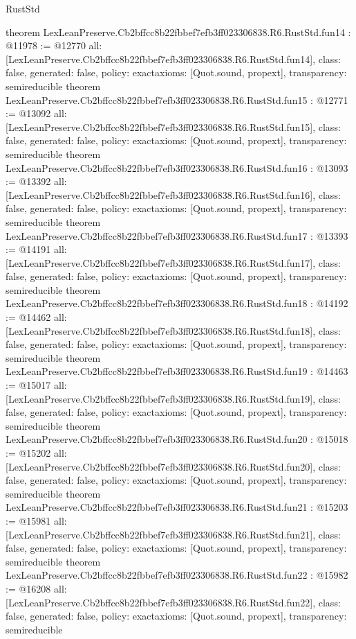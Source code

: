 \begin{lexlean}{RustStd}
\begin{coremodule}
{}
theorem LexLeanPreserve.Cb2bffcc8b22fbbef7efb3ff023306838.R6.RustStd.fun14 : @11978 := @12770 {
  all: [LexLeanPreserve.Cb2bffcc8b22fbbef7efb3ff023306838.R6.RustStd.fun14],
  class: false,
  generated: false,
  policy: exact{axioms: [Quot.sound, propext]},
  transparency: semireducible
}
theorem LexLeanPreserve.Cb2bffcc8b22fbbef7efb3ff023306838.R6.RustStd.fun15 : @12771 := @13092 {
  all: [LexLeanPreserve.Cb2bffcc8b22fbbef7efb3ff023306838.R6.RustStd.fun15],
  class: false,
  generated: false,
  policy: exact{axioms: [Quot.sound, propext]},
  transparency: semireducible
}
theorem LexLeanPreserve.Cb2bffcc8b22fbbef7efb3ff023306838.R6.RustStd.fun16 : @13093 := @13392 {
  all: [LexLeanPreserve.Cb2bffcc8b22fbbef7efb3ff023306838.R6.RustStd.fun16],
  class: false,
  generated: false,
  policy: exact{axioms: [Quot.sound, propext]},
  transparency: semireducible
}
theorem LexLeanPreserve.Cb2bffcc8b22fbbef7efb3ff023306838.R6.RustStd.fun17 : @13393 := @14191 {
  all: [LexLeanPreserve.Cb2bffcc8b22fbbef7efb3ff023306838.R6.RustStd.fun17],
  class: false,
  generated: false,
  policy: exact{axioms: [Quot.sound, propext]},
  transparency: semireducible
}
theorem LexLeanPreserve.Cb2bffcc8b22fbbef7efb3ff023306838.R6.RustStd.fun18 : @14192 := @14462 {
  all: [LexLeanPreserve.Cb2bffcc8b22fbbef7efb3ff023306838.R6.RustStd.fun18],
  class: false,
  generated: false,
  policy: exact{axioms: [Quot.sound, propext]},
  transparency: semireducible
}
theorem LexLeanPreserve.Cb2bffcc8b22fbbef7efb3ff023306838.R6.RustStd.fun19 : @14463 := @15017 {
  all: [LexLeanPreserve.Cb2bffcc8b22fbbef7efb3ff023306838.R6.RustStd.fun19],
  class: false,
  generated: false,
  policy: exact{axioms: [Quot.sound, propext]},
  transparency: semireducible
}
theorem LexLeanPreserve.Cb2bffcc8b22fbbef7efb3ff023306838.R6.RustStd.fun20 : @15018 := @15202 {
  all: [LexLeanPreserve.Cb2bffcc8b22fbbef7efb3ff023306838.R6.RustStd.fun20],
  class: false,
  generated: false,
  policy: exact{axioms: [Quot.sound, propext]},
  transparency: semireducible
}
theorem LexLeanPreserve.Cb2bffcc8b22fbbef7efb3ff023306838.R6.RustStd.fun21 : @15203 := @15981 {
  all: [LexLeanPreserve.Cb2bffcc8b22fbbef7efb3ff023306838.R6.RustStd.fun21],
  class: false,
  generated: false,
  policy: exact{axioms: [Quot.sound, propext]},
  transparency: semireducible
}
theorem LexLeanPreserve.Cb2bffcc8b22fbbef7efb3ff023306838.R6.RustStd.fun22 : @15982 := @16208 {
  all: [LexLeanPreserve.Cb2bffcc8b22fbbef7efb3ff023306838.R6.RustStd.fun22],
  class: false,
  generated: false,
  policy: exact{axioms: [Quot.sound, propext]},
  transparency: semireducible
}
\end{coremodule}
\end{lexlean}
